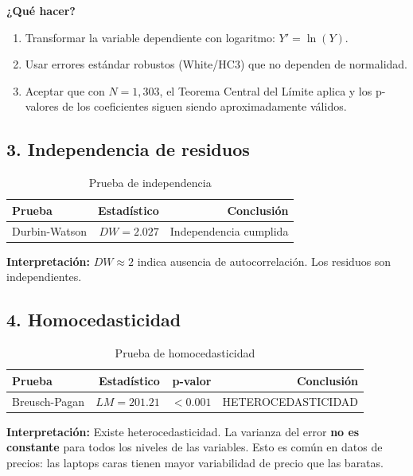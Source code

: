 \documentclass[12pt,a4paper]{article}
\begin{document}
\textbf{¿Qué hacer?} 
\begin{enumerate}
    \item Transformar la variable dependiente con logaritmo: $Y' = \ln(Y)$.
    \item Usar errores estándar robustos (White/HC3) que no dependen de normalidad.
    \item Aceptar que con $N = 1{,}303$, el Teorema Central del Límite aplica y los p-valores de los coeficientes siguen siendo aproximadamente válidos.
\end{enumerate}

\subsection{3. Independencia de residuos}

\begin{table}[H]
\centering
\caption{Prueba de independencia}
\begin{tabular}{lrr}
\toprule
\textbf{Prueba} & \textbf{Estadístico} & \textbf{Conclusión} \\
\midrule
Durbin-Watson & $DW = 2.027$ & \textcolor{verdeok}{Independencia cumplida} \\
\bottomrule
\end{tabular}
\end{table}

\textbf{Interpretación:} $DW \approx 2$ indica ausencia de autocorrelación. Los residuos son independientes.

\subsection{4. Homocedasticidad}

\begin{table}[H]
\centering
\caption{Prueba de homocedasticidad}
\begin{tabular}{lrrr}
\toprule
\textbf{Prueba} & \textbf{Estadístico} & \textbf{p-valor} & \textbf{Conclusión} \\
\midrule
Breusch-Pagan & $LM = 201.21$ & $<0.001$ & \textcolor{rojoacento}{HETEROCEDASTICIDAD} \\
\bottomrule
\end{tabular}
\end{table}

\textbf{Interpretación:} Existe heterocedasticidad. La varianza del error \textbf{no es constante} para todos los niveles de las variables. Esto es común en datos de precios: las laptops caras tienen mayor variabilidad de precio que las baratas.
\end{document}
